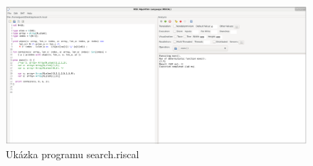 \documentclass{article}
\begin{document}
\begin{figure}[H]
    \centering
    \caption{Ukázka programu search.riscal}
    \includegraphics[width=\textwidth]{RiscalRun.png}
\end{figure}
\end{document}
